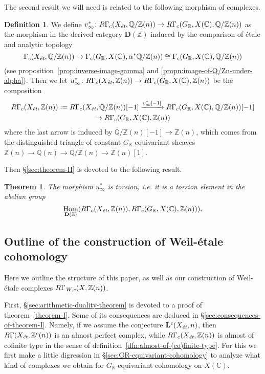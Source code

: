 \documentclass[leqno,12pt]{article}
\theoremstyle{plain}
\newtheorem{maintheorem}{Theorem}
\theoremstyle{definition}
\newtheorem{definition}[theorem]{\indent\sc Definition}
\DeclareMathOperator{\Hom}{Hom}
\newcommand{\CC}{\mathbb{C}}
\newcommand{\QQ}{\mathbb{Q}}
\newcommand{\RR}{\mathbb{R}}
\newcommand{\ZZ}{\mathbb{Z}}
\newcommand{\dfn}{\mathrel{\mathop:}=}
\newcommand{\Wc}{\text{\it W,c}}
\newcommand{\et}{\text{\it \'{e}t}}
\begin{document}
The second result we will need is related to the following morphism of
complexes.

\begin{definition}
  \label{dfn:u-infty}
  We define
  $v_\infty^*\colon R\Gamma_c (X_\et, \QQ/\ZZ (n)) \to R\Gamma_c (G_\RR, X (\CC), \QQ/\ZZ (n))$
  as the morphism in the derived category $\mathbf{D} (\ZZ)$ induced by the
  comparison of \'{e}tale and analytic topology
  \[ \Gamma_c (X_\et, \QQ/\ZZ (n)) \to
  \Gamma_c (G_\RR, X (\CC), \alpha^* \QQ/\ZZ (n)) \cong
  \Gamma_c (G_\RR, X (\CC), \QQ/\ZZ (n)) \]
  (see proposition~\ref{prop:inverse-image-gamma} and
  \ref{propn:image-of-Q/Zn-under-alpha}). Then we let
  $u_\infty^*\colon R\Gamma_c (X_\et, \ZZ(n)) \to R\Gamma_c (G_\RR, X (\CC), \ZZ (n))$
  be the composition
  \begin{multline*}
    R\Gamma_c (X_\et, \ZZ(n)) \dfn R\Gamma_c (X_\et, \QQ/\ZZ (n)) [-1]
    \xrightarrow{v_\infty^* [-1]} R\Gamma_c (G_\RR, X (\CC), \QQ/\ZZ (n)) [-1]
    \\ \to R\Gamma_c (G_\RR, X (\CC), \ZZ (n))
  \end{multline*}
  where the last arrow is induced by $\QQ/\ZZ (n) [-1] \to \ZZ (n)$, which comes
  from the distinguished triangle of constant $G_\RR$-equivariant sheaves
  $\ZZ (n) \to \QQ (n) \to \QQ/\ZZ (n) \to \ZZ (n) [1]$.
\end{definition}

Then \S\ref{sec:theorem-II} is devoted to the following result.

\begin{maintheorem}
  \label{theorem-II}
  The morphism $u_\infty^*$ is torsion, i.e. it is a torsion element in the
  abelian group
  $$\Hom_{\mathbf{D} (\ZZ)} (R\Gamma_c (X_\et, \ZZ(n)), R\Gamma_c (G_\RR, X (\CC), \ZZ(n))).$$
\end{maintheorem}

\subsection*{Outline of the construction of Weil-\'{e}tale cohomology}

Here we outline the structure of this paper, as well as our construction of
Weil-\'{e}tale complexes $R\Gamma_\Wc (X, \ZZ (n))$.

First, \S\ref{sec:arithmetic-duality-theorem} is devoted to a proof of
theorem~\ref{theorem-I}. Some of its consequences are deduced in
\S\ref{sec:consequences-of-theorem-I}. Namely, if we assume the conjecture
$\mathbf{L}^c (X_\et, n)$, then $R\Gamma (X_\et, \ZZ^c (n))$ is an almost
perfect complex, while $R\Gamma_c (X_\et, \ZZ (n))$ is almost of cofinite type
in the sense of definition~\ref{dfn:almost-of-(co)finite-type}. For this we
first make a little digression in \S\ref{sec:GR-equivariant-cohomology} to
analyze what kind of complexes we obtain for $G_\RR$-equivariant cohomology on
$X (\CC)$.
\end{document}
